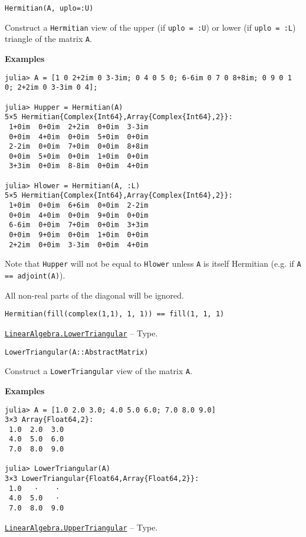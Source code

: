 \begin{adjustwidth}{2em}{0pt}


\begin{verbatim}
Hermitian(A, uplo=:U)
\end{verbatim}

Construct a \texttt{Hermitian} view of the upper (if \texttt{uplo = :U}) or lower (if \texttt{uplo = :L}) triangle of the matrix \texttt{A}.

\textbf{Examples}


\begin{verbatim}
julia> A = [1 0 2+2im 0 3-3im; 0 4 0 5 0; 6-6im 0 7 0 8+8im; 0 9 0 1 0; 2+2im 0 3-3im 0 4];

julia> Hupper = Hermitian(A)
5×5 Hermitian{Complex{Int64},Array{Complex{Int64},2}}:
 1+0im  0+0im  2+2im  0+0im  3-3im
 0+0im  4+0im  0+0im  5+0im  0+0im
 2-2im  0+0im  7+0im  0+0im  8+8im
 0+0im  5+0im  0+0im  1+0im  0+0im
 3+3im  0+0im  8-8im  0+0im  4+0im

julia> Hlower = Hermitian(A, :L)
5×5 Hermitian{Complex{Int64},Array{Complex{Int64},2}}:
 1+0im  0+0im  6+6im  0+0im  2-2im
 0+0im  4+0im  0+0im  9+0im  0+0im
 6-6im  0+0im  7+0im  0+0im  3+3im
 0+0im  9+0im  0+0im  1+0im  0+0im
 2+2im  0+0im  3-3im  0+0im  4+0im
\end{verbatim}

Note that \texttt{Hupper} will not be equal to \texttt{Hlower} unless \texttt{A} is itself Hermitian (e.g. if \texttt{A == adjoint(A)}).

All non-real parts of the diagonal will be ignored.


\begin{verbatim}
Hermitian(fill(complex(1,1), 1, 1)) == fill(1, 1, 1)
\end{verbatim}



\end{adjustwidth}
\hypertarget{15116078732779234709}{} 
\hyperlink{15116078732779234709}{\texttt{LinearAlgebra.LowerTriangular}}  -- {Type.}

\begin{adjustwidth}{2em}{0pt}


\begin{verbatim}
LowerTriangular(A::AbstractMatrix)
\end{verbatim}

Construct a \texttt{LowerTriangular} view of the matrix \texttt{A}.

\textbf{Examples}


\begin{verbatim}
julia> A = [1.0 2.0 3.0; 4.0 5.0 6.0; 7.0 8.0 9.0]
3×3 Array{Float64,2}:
 1.0  2.0  3.0
 4.0  5.0  6.0
 7.0  8.0  9.0

julia> LowerTriangular(A)
3×3 LowerTriangular{Float64,Array{Float64,2}}:
 1.0   ⋅    ⋅
 4.0  5.0   ⋅
 7.0  8.0  9.0
\end{verbatim}



\end{adjustwidth}
\hypertarget{6344726545165008167}{} 
\hyperlink{6344726545165008167}{\texttt{LinearAlgebra.UpperTriangular}}  -- {Type.}

